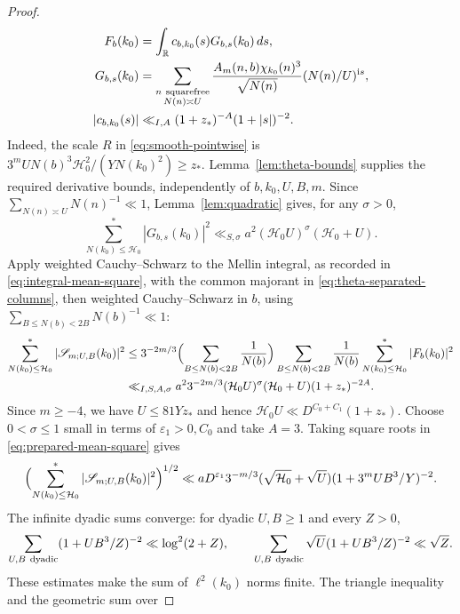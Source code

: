 \documentclass[11pt,a4paper]{article}
\numberwithin{equation}{section}
\numberwithin{figure}{section}
\theoremstyle{definition}
\theoremstyle{remark}
\begin{document}
\begin{proof}
\begin{equation}\label{eq:theta-separated-columns}
 \begin{aligned}
 F_b(k_0)&=\int_{\mathbb R}c_{b,k_0}(s)G_{b,s}(k_0)\,ds,\\
 G_{b,s}(k_0)&=\sum_{\substack{n\ {\rm squarefree}\\N(n)\asymp U}}
 \frac{A_m(n,b)\chi_{k_0}(n)^3}{\sqrt{N(n)}}
             (N(n)/U)^{\mathrm i s},\\
 |c_{b,k_0}(s)|&\ll_{I,A}(1+z_*)^{-A}(1+|s|)^{-2}.
 \end{aligned}
\end{equation}
Indeed, the scale $R$ in \eqref{eq:smooth-pointwise} is
$3^mUN(b)^3\mathcal H_0^2/(YN(k_0)^2)\ge z_*$.
Lemma~\ref{lem:theta-bounds} supplies the required derivative
bounds, independently of $b,k_0,U,B,m$.
Since $\sum_{N(n)\asymp U}N(n)^{-1}\ll1$,
Lemma~\ref{lem:quadratic} gives, for any $\sigma>0$,
\[
 \sum_{N(k_0)\le\mathcal H_0}^*|G_{b,s}(k_0)|^2
 \ll_{S,\sigma}a^2(\mathcal H_0U)^\sigma(\mathcal H_0+U).
\]
Apply weighted Cauchy--Schwarz to the Mellin integral, as recorded in
\eqref{eq:integral-mean-square}, with the common majorant in
\eqref{eq:theta-separated-columns}, then weighted Cauchy--Schwarz in $b$, using
$\sum_{B\le N(b)<2B}N(b)^{-1}\ll1$:
\begin{equation}\label{eq:prepared-mean-square}
 \begin{aligned}
 \sum_{N(k_0)\le\mathcal H_0}^*|\mathscr S_{m;U,B}(k_0)|^2
 &\le3^{-2m/3}\Bigl(\sum_{B\le N(b)<2B}\frac1{N(b)}\Bigr)
       \sum_{B\le N(b)<2B}\frac1{N(b)}
       \sum_{N(k_0)\le\mathcal H_0}^*|F_b(k_0)|^2\\
 &\ll_{I,S,A,\sigma}a^2 3^{-2m/3}
       (\mathcal H_0U)^\sigma(\mathcal H_0+U)(1+z_*)^{-2A}.
 \end{aligned}
\end{equation}
Since $m\ge-4$, we have $U\le81Yz_*$ and hence
$\mathcal H_0U\ll D^{C_0+C_1}(1+z_*)$.
Choose $0<\sigma\le1$ small in terms of $\varepsilon_1>0,C_0$ and take
$A=3$. Taking square roots in \eqref{eq:prepared-mean-square} gives
\[
 \Bigl(\sum_{N(k_0)\le\mathcal H_0}^*|\mathscr S_{m;U,B}(k_0)|^2\Bigr)^{1/2}
 \ll aD^{\varepsilon_1}3^{-m/3}
       (\sqrt{\mathcal H_0}+\sqrt U)(1+3^mUB^3/Y)^{-2}.
\]
The infinite dyadic sums converge: for dyadic $U,B\ge1$ and every $Z>0$,
\[
 \sum_{U,B\ {\rm dyadic}}(1+UB^3/Z)^{-2}\ll\log^2(2+Z),
 \qquad
 \sum_{U,B\ {\rm dyadic}}\sqrt U(1+UB^3/Z)^{-2}\ll\sqrt Z.
\]
These estimates make the sum of $\ell^2(k_0)$ norms finite.
The triangle inequality and the geometric sum over

\end{proof}
\end{document}

